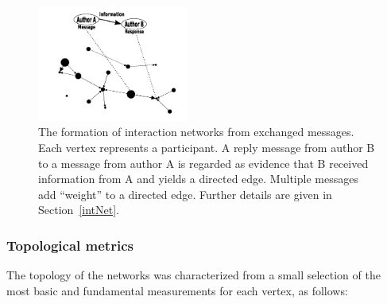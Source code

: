 \documentclass[%
aip,
jmp,%
amsmath,amssymb,
reprint,%
]{revtex4-1}
\begin{document}
\begin{figure}[!h]
\centering
\includegraphics[width=0.44\textwidth]{figs/criaRede2_}
\caption{The formation of interaction networks from exchanged messages. Each vertex represents a participant. A reply message from author B to a message from author A is regarded as evidence that B received information from A and yields a directed edge. 	Multiple messages add ``weight'' to a directed edge. Further details are given in Section~\ref{intNet}.}
\label{formationNetwork}
\end{figure}


\subsubsection{Topological metrics}\label{measures}

The topology of the networks was characterized 
from a small selection of the most basic and 
fundamental measurements for each vertex, as follows:
\end{document}
